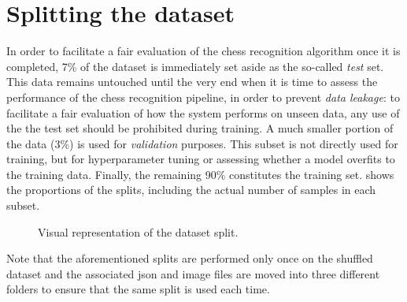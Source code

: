 \documentclass[../report.tex]{subfiles}
\begin{document}
\section{Splitting the dataset}
\label{sec:split_dataset}
In order to facilitate a fair evaluation of the chess recognition algorithm once it is completed, 7\% of the dataset is immediately set aside as the so-called \emph{test} set.
This data remains untouched until the very end when it is time to assess the performance of the chess recognition pipeline, in order to prevent \emph{data leakage}: 
to facilitate a fair evaluation of how the system performs on unseen data, any use of the the test set should be prohibited during training.
A much smaller portion of the data (3\%) is used for \emph{validation} purposes.
This subset is not directly used for training, but for hyperparameter tuning or assessing whether a model overfits to the training data.
Finally, the remaining 90\% constitutes the training set.
 shows the proportions of the splits, including the actual number of samples in each subset.
\begin{figure}
    \caption{Visual representation of the dataset split.}
    \label{fig:dataset_split}
\end{figure}
Note that the aforementioned splits are performed only once on the shuffled dataset and the associated \gls{json} and image files are moved into three different folders to ensure that the same split is used each time.
\end{document}
